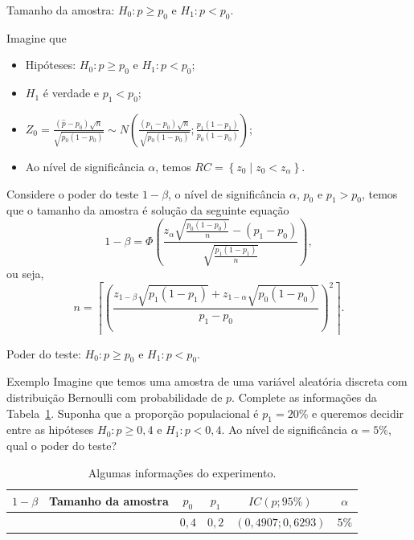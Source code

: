 \documentclass[8pt]{beamer}
\begin{document}
\begin{frame}{Tamanho da amostra: $H_0: p \geq p_0$ e $H_1: p < p_0$.}

Imagine que 
\begin{itemize}
\item Hipóteses: $H_0:p \geq p_0$ e $H_1: p < p_0$;
\item $H_1$ é verdade e $p_1 < p_0$;
\item $Z_0 = \frac{(\hat{p}-p_0)\sqrt{n}}{\sqrt{p_0 (1-p_0)}} \sim N \left( \frac{(p_1 - p_0)\sqrt{n}}{\sqrt{p_0(1-p_0)}}; \frac{p_1(1-p_1)}{p_0(1-p_0)} \right)$;
\item Ao nível de significância $\alpha$, temos $RC = \left\{ z_0 \mid z_0 < z_{\alpha}  \right\}$.
\end{itemize}

Considere o poder do teste $1-\beta$, o nível de significância $\alpha$, $p_0$ e $p_1 > p_0$, temos que o tamanho da amostra é solução da seguinte equação
$$1-\beta =\Phi\left( \frac{ z_{\alpha} \sqrt{ \frac{p_0(1-p_0)}{n}} - (p_1 - p_0)  }{ \sqrt{ \frac{ p_1(1-p_1) }{ n } } } \right), $$
ou seja, 
$$n = \left\lceil \left( \frac{ z_{1-\beta} \sqrt{p_1(1-p_1)} + z_{1-\alpha} \sqrt{p_0(1-p_0)} }{p_1 - p_0} \right)^2 \right\rceil.$$
\end{frame}

\begin{frame}{Poder do teste: $H_0: p \geq p_0$ e $H_1: p < p_0$.}

\large

\begin{block}{Exemplo}
	Imagine que temos uma amostra de uma variável aleatória discreta com distribuição Bernoulli com probabilidade de $p$. Complete as informações da Tabela~\ref{tab:proportion-unilateral-h0-upper-power}. Suponha que a proporção populacional é $p_1=20\%$ e queremos decidir entre as hipóteses $H_0: p \geq 0,4$ e $H_1:p < 0,4$. Ao nível de significância $\alpha=5\%$, qual o poder do teste?
	\begin{table}[ht]
		\centering
		\begin{tabular}{c|c|c|c|c|c}
			\toprule[0.05cm]
			$1-\beta$ & Tamanho da amostra & $p_0$ & $p_1$ & $IC(p; 95\%)$ & $\alpha$ \\ 
			\midrule
			&  & $0,4$ & $0,2$ &  $(0,4907;0,6293)$ & $5\%$ \\ 
			\bottomrule[0.05cm]
		\end{tabular}
		\caption{Algumas informações do experimento.} 
		\label{tab:proportion-unilateral-h0-upper-power}
	\end{table}
\end{block}

\normalsize
\end{frame}
\end{document}
